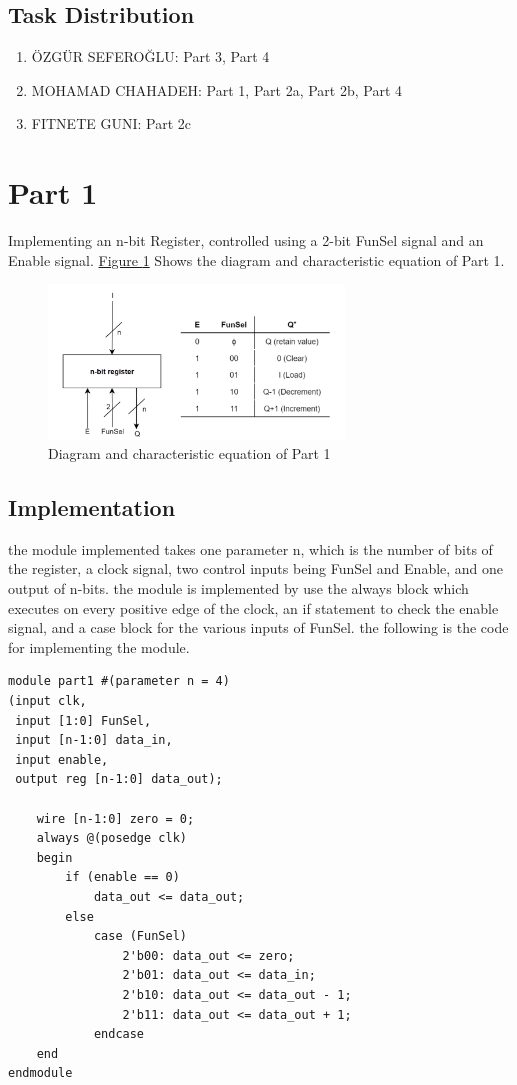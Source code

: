 \documentclass[pdftex,12pt,a4paper]{article}
\begin{document}
\subsection{Task Distribution}
\begin{enumerate}
\item ÖZGÜR SEFEROĞLU:  Part 3, Part 4
\item MOHAMAD CHAHADEH:  Part 1, Part 2a, Part 2b, Part 4
\item FITNETE GUNI: Part 2c
\end{enumerate}

\pagebreak

\section{Part 1}
Implementing an n-bit Register, controlled using a 2-bit FunSel signal and an Enable signal. \hyperref[fig:part1_char]{Figure \ref{fig:part1_char}} Shows the diagram and characteristic equation of Part 1.

\begin{figure}[H]
\centering
\includegraphics[width=0.7\textwidth]{part1_diagram.png}
\caption{Diagram and characteristic equation of Part 1}
\label{fig:part1_char}
\end{figure}

\subsection{Implementation}
the module implemented takes one parameter n, which is the number of bits of the register, a clock signal, two control inputs being FunSel and Enable, and one output of n-bits. the module is implemented by use the always block which executes on every positive edge of the clock, an if statement to check the enable signal, and a case block for the various inputs of FunSel. the following is the code for implementing the module.
\vspace{0.7cm}

\begin{lstlisting}
module part1 #(parameter n = 4) 
(input clk,
 input [1:0] FunSel,
 input [n-1:0] data_in, 
 input enable, 
 output reg [n-1:0] data_out);

    wire [n-1:0] zero = 0;
    always @(posedge clk)
    begin
        if (enable == 0)
            data_out <= data_out;
        else
            case (FunSel)
                2'b00: data_out <= zero;
                2'b01: data_out <= data_in;
                2'b10: data_out <= data_out - 1;
                2'b11: data_out <= data_out + 1;
            endcase
    end
endmodule
\end{lstlisting}
\end{document}
